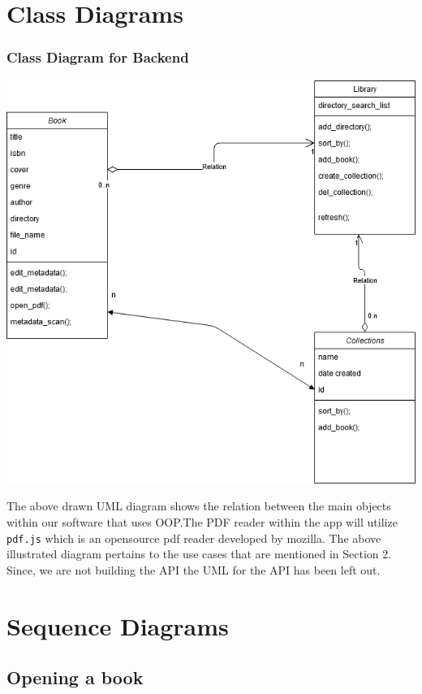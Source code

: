 \documentclass[answers]{exam}
\begin{document}
\section{Class Diagrams}

\subsubsection{Class Diagram for Backend}
\begin{center}
    \includegraphics[scale=0.5]{Class Diagram.png}
\end{center}
The above drawn UML diagram shows the relation between the main objects within our software that uses OOP.The PDF reader within the app will utilize \texttt{pdf.js} which is an opensource pdf reader developed by mozilla. The above illustrated diagram pertains to the use cases that are mentioned in Section 2. Since, we are not building the API the UML for the API has been left out.

\section{Sequence Diagrams}
\subsection{Opening a book}
\end{document}
